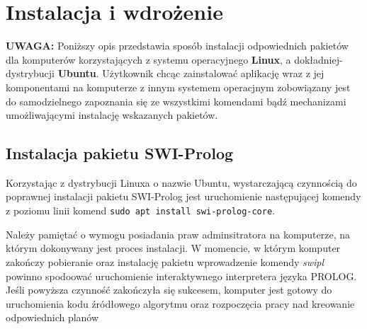 \chapter{Instalacja i wdrożenie}
\thispagestyle{chapterBeginStyle}

\textbf{UWAGA:} Poniższy opis przedstawia sposób instalacji odpowiednich pakietów dla komputerów korzystających z systemu operacyjnego 
\textbf{Linux}, a dokładniej- dystrybucji \textbf{Ubuntu}. Użytkownik chcąc zainstalować aplikację wraz z jej komponentami na 
komputerze z innym systemem operacjnym zobowiązany jest do samodzielnego zapoznania się ze wszystkimi komendami bądź mechanizami 
umożliwającymi instalację wskazanych pakietów.

\section{Instalacja pakietu SWI-Prolog}
\label{SWI-PROLOGRozdzial}
    Korzystając z dystrybucji Linuxa o nazwie Ubuntu, wystarczającą czynnością do poprawnej instalacji pakietu SWI-Prolog jest uruchomienie 
    następującej komendy z poziomu linii komend \texttt{sudo apt install swi-prolog-core}.
    
    Należy pamiętać o wymogu posiadania praw adminsitratora na komputerze, na którym dokonywany jest proces instalacji.
    W momencie, w którym komputer zakończy pobieranie oraz instalację pakietu wprowadzenie komendy \textit{swipl} powinno spodoować uruchomienie 
    interaktywnego interpretera języka PROLOG. Jeśli powyższa czynność zakończyła się sukcesem, komputer jest gotowy do uruchomienia kodu źródłowego 
    algorytmu oraz rozpoczęcia pracy nad kreowanie odpowiednich planów
